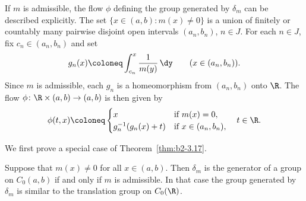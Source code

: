 \begin{remark}\label{rem:b2-3.17}
If\/ $m$ is admissible, the flow $\phi$ defining the group generated by $\delta_{m}$
can be described explicitly.
The set $\{x \in (a,b) : m(x) \neq 0\}$ is a union of finitely or countably many
pairwise disjoint open intervals $(a_{n},b_{n})$, $n \in J$.
For each $n \in J$, fix $c_{n} \in (a_{n},b_{n})$ and set
\[
    g_{n}(x) \coloneq \int_{c_{n}}^{x} \frac{1}{m(y)}\,\dy \qquad (x \in (a_{n},b_{n})).
\]
Since $m$ is admissible, each $g_{n}$ is a homeomorphism from $(a_{n},b_{n})$ onto $\R$.
The flow $\phi \colon \R \times (a,b) \to (a,b)$ is then given by
\begin{equation}\label{eq:b2-3.22}
    \phi(t,x) \coloneq \begin{cases}
        x                       & \text{if } m(x) = 0, \\
        g_{n}^{-1}(g_{n}(x)+t) & \text{if } x \in (a_{n},b_{n}),
    \end{cases}
    \quad t \in \R.
\end{equation}
\end{remark}
We first prove a special case of Theorem~\ref{thm:b2-3.17}.
\begin{proposition}\label{prop:b2-3.18}
%
Suppose that $m(x) \neq 0$ for all $x \in (a,b)$.
Then $\delta_{m}$ is the generator of a group on $C_{0}(a,b)$ if and only if\/ $m$ is admissible.
In that case the group generated by $\delta_{m}$ is similar to the translation group on $C_{0}(\R)$.
\end{proposition}
